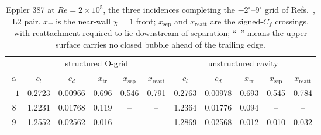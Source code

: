 \begin{table}[tp]
  \centering\small
  \caption{Eppler 387 at $Re\!=\!2\!\times\!10^5$, the three incidences completing the $-2^\circ$--$9^\circ$ grid of Refs.~\cite{shahjahan_2024, cole_mueller_1990}, L2 pair. $x_\mathrm{tr}$ is the near-wall $\chi\!=\!1$ front; $x_\mathrm{sep}$ and $x_\mathrm{reatt}$ are the signed-$C_f$ crossings, with reattachment required to lie downstream of separation; ``--'' means the upper surface carries no closed bubble ahead of the trailing edge.}
  \label{tab:exteppalpha}
  \begin{tabular}{c ccccc ccccc}
    \toprule
    & \multicolumn{5}{c}{structured O-grid} & \multicolumn{5}{c}{unstructured cavity} \\
    \cmidrule(lr){2-6}\cmidrule(lr){7-11}
    $\alpha$ & $c_l$ & $c_d$ & $x_\mathrm{tr}$ & $x_\mathrm{sep}$ & $x_\mathrm{reatt}$
             & $c_l$ & $c_d$ & $x_\mathrm{tr}$ & $x_\mathrm{sep}$ & $x_\mathrm{reatt}$ \\
    \midrule
    $-1$ & 0.2723 & 0.00966 & 0.696 & 0.546 & 0.791 & 0.2763 & 0.00978 & 0.693 & 0.545 & 0.784 \\
    $8$ & 1.2231 & 0.01768 & 0.119 & -- & -- & 1.2364 & 0.01776 & 0.094 & -- & -- \\
    $9$ & 1.2552 & 0.02562 & 0.016 & -- & -- & 1.2869 & 0.02568 & 0.012 & 0.010 & 0.032 \\
    \bottomrule
  \end{tabular}
\end{table}
